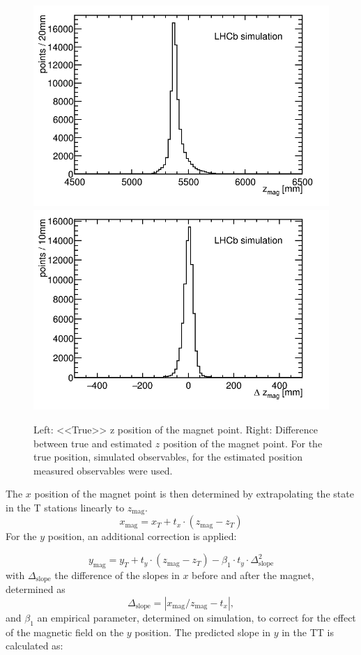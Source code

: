 \begin{figure}
 \begin{center}
   \includegraphics[width=0.49\linewidth]{figures/zMag.png}
    \includegraphics[width=0.49\linewidth]{figures/deltaZMag.png}
   \caption{Left: <<True>> z position of the magnet point. Right: Difference
   between true and estimated $z$ position of the magnet point. For the true position, simulated observables, for the estimated position measured observables were used.
     \label{fig:zMag}}
 \end{center}
\end{figure}

The $x$ position of the magnet point is then determined by extrapolating the
state in the T stations linearly to $z_{\text{mag}}$.
\begin{equation}
x_{\text{mag}} = x_{T} + t_{x} \cdot (z_{\text{mag}} - z_{T})
\end{equation}
For the $y$ position, an additional correction is applied:

\begin{equation}
\label{eq:ymag}
y_{\text{mag}} = y_{T} + t_{y} \cdot (z_{\text{mag}} - z_{T}) - \beta_{1} \cdot t_{y} \cdot \Delta_{\text{slope}}^{2}
\end{equation}
with $\Delta_{\text{slope}}$ the difference of the slopes in $x$ before and after the magnet, determined as
\begin{equation}
\Delta_{\text{slope}} = \left| x_{\text{mag}}/z_{\text{mag}} - t_{x} \right|,
\end{equation}
and $\beta_{1}$ an empirical parameter, determined on simulation, to correct
for the effect of the magnetic field on the $y$ position.
The predicted slope in $y$ in the TT is calculated as:

